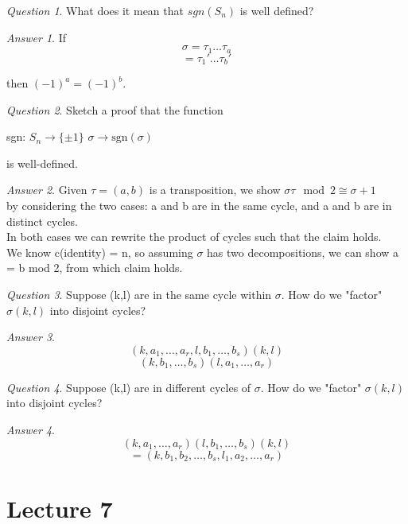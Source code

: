 \documentclass[]{article}
\theoremstyle{remark}
\theoremstyle{qnstyle}
\newtheorem{question}{Question}
\theoremstyle{answerstyle}
\newtheorem*{answer}{Answer}
\begin{document}
\begin{question}
    What does it mean that $sgn(S_n)$ is well defined?
\end{question}
\begin{answer}
    If $$\sigma = \tau_1 \ldots \tau_a$$
    $$= \tau_1' \ldots \tau_b'$$

    then $(-1)^a = (-1)^b$.
\end{answer}


\begin{question}
    Sketch a proof that the function

    sgn: $S_n \to \{\pm 1\}$
    $\sigma \to \text{sgn}(\sigma)$

    is well-defined.
\end{question}
\begin{answer}
    Given $\tau = (a,b)$ is a transposition, we show $\sigma \tau \mod 2 \cong \sigma + 1$  \\
    by considering the two cases: a and b are in the same cycle, and a and b are in distinct cycles.  \\
    In both cases we can rewrite the product of cycles such that the claim holds. \\
    We know c(identity) = n, so assuming $\sigma$ has two decompositions, we can show a = b mod 2, from which claim holds.
\end{answer}


\begin{question}
    Suppose (k,l) are in the same cycle within $\sigma$. How do we "factor" $\sigma (k,l)$ into disjoint cycles?
\end{question}
\begin{answer}
    $$(k, a_1, \ldots, a_r,l, b_1, \ldots, b_s)(k,l)$$
    $$(k, b_1, \ldots, b_s)(l, a_1, \ldots, a_r)$$
\end{answer}

\begin{question}
    Suppose (k,l) are in different cycles of $\sigma$. How do we "factor" $\sigma (k,l)$ into disjoint cycles?
\end{question}
\begin{answer}
    $$(k, a_1, \ldots, a_r)(l, b_1, \ldots, b_s)(k, l)$$
    $$= (k, b_1, b_2, \ldots, b_s, l_1, a_2, \ldots, a_r)$$
\end{answer}






\section* {Lecture 7}
\end{document}
